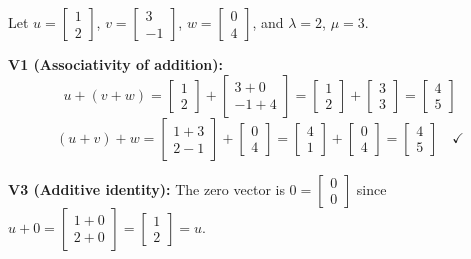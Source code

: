 \documentclass[11pt]{article}
\theoremstyle{definition}
\theoremstyle{plain}
\theoremstyle{remark}
\begin{document}
\begin{workedexample}[title=\textbf{Worked Example: $\mathbb{R}^2$ is a vector space}]
Let $u = \begin{bmatrix} 1 \\ 2 \end{bmatrix}$, $v = \begin{bmatrix} 3 \\ -1 \end{bmatrix}$, $w = \begin{bmatrix} 0 \\ 4 \end{bmatrix}$, and $\lambda = 2$, $\mu = 3$.

\textbf{V1 (Associativity of addition):}
\[
u + (v + w) = \begin{bmatrix}1\\2\end{bmatrix} + \begin{bmatrix}3+0\\-1+4\end{bmatrix} = \begin{bmatrix}1\\2\end{bmatrix} + \begin{bmatrix}3\\3\end{bmatrix} = \begin{bmatrix}4\\5\end{bmatrix}
\]
\[
(u + v) + w = \begin{bmatrix}1+3\\2-1\end{bmatrix} + \begin{bmatrix}0\\4\end{bmatrix} = \begin{bmatrix}4\\1\end{bmatrix} + \begin{bmatrix}0\\4\end{bmatrix} = \begin{bmatrix}4\\5\end{bmatrix} \quad \checkmark
\]

\textbf{V3 (Additive identity):} The zero vector is $0 = \begin{bmatrix}0\\0\end{bmatrix}$ since $u + 0 = \begin{bmatrix}1+0\\2+0\end{bmatrix} = \begin{bmatrix}1\\2\end{bmatrix} = u$. \checkmark


\end{workedexample}
\end{document}

